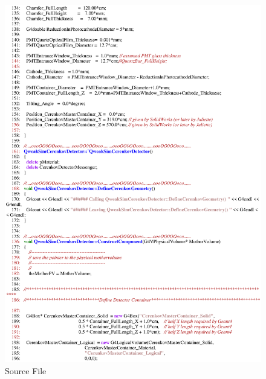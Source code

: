 \begin{figure}[ht]
  \hspace{0cm}
  \includegraphics[scale=0.8]{./figures5/QweakSimCerenkovDetector.cc-p3.eps}
  \caption{Source File}
           \label{fig:V-SC-7}
\end{figure}
\clearpage

